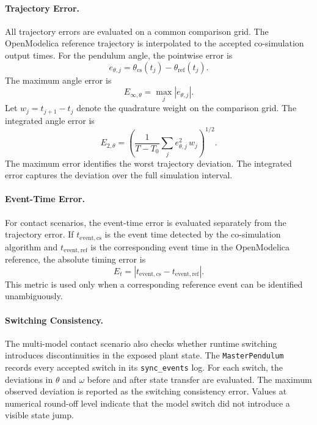 \paragraph{Trajectory Error.}
All trajectory errors are evaluated on a common comparison grid.
The OpenModelica reference trajectory is interpolated to the accepted co-simulation output times.
For the pendulum angle, the pointwise error is
\begin{equation}
  e_{\theta,j}
  =
  \theta_{\mathrm{cs}}(t_j)
  -
  \theta_{\mathrm{ref}}(t_j) .
\end{equation}
The maximum angle error is
\begin{equation}
  E_{\infty,\theta}
  =
  \max_j |e_{\theta,j}| .
\end{equation}
Let $w_j=t_{j+1}-t_j$ denote the quadrature weight on the comparison grid.
The integrated angle error is
\begin{equation}
  E_{2,\theta}
  =
  \left(
    \frac{1}{T - T_0}
    \sum_j e_{\theta,j}^{2}\,w_j
  \right)^{1/2}.
\end{equation}
The maximum error identifies the worst trajectory deviation.
The integrated error captures the deviation over the full simulation interval.

\paragraph{Event-Time Error.}
For contact scenarios, the event-time error is evaluated separately from the trajectory error.
If $t_{\mathrm{event,cs}}$ is the event time detected by the co-simulation algorithm and $t_{\mathrm{event,ref}}$ is the corresponding event time in the OpenModelica reference, the absolute timing error is
\begin{equation}
  E_{t}
  =
  |t_{\mathrm{event,cs}} - t_{\mathrm{event,ref}}| .
\end{equation}
This metric is used only when a corresponding reference event can be identified unambiguously.

\paragraph{Switching Consistency.}
The multi-model contact scenario also checks whether runtime switching introduces discontinuities in the exposed plant state.
The \texttt{MasterPendulum} records every accepted switch in its \texttt{sync\_events} log.
For each switch, the deviations in \(\theta\) and \(\omega\) before and after state transfer are evaluated.
The maximum observed deviation is reported as the switching consistency error.
Values at numerical round-off level indicate that the model switch did not introduce a visible state jump.

